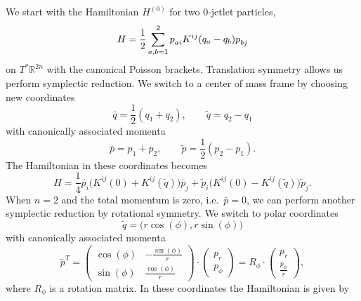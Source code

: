 \documentclass[12pt]{amsart}
\newcommand{\R}{\ensuremath{\mathbb{R}}}
\begin{document}
We start with the Hamiltonian $H^{(0)}$ for two $0$-jetlet particles,
\begin{equation}\label{eq:H-two-0jetlets}
  H = \frac{1}{2} \sum_{a,b=1}^2 p\indices{_a_i} K^{ij}(q_a - q_b) p\indices{_b_j}
\end{equation}
on $T^* \R^{2n}$ with the canonical Poisson brackets.
Translation symmetry allows us perform symplectic reduction. We switch
to a center of mass frame by choosing new coordinates
\begin{equation}\label{eq:CoM-coords}
  \bar{q} = \frac{1}{2}(q_1 + q_2), \qquad \tilde{q} = q_2 - q_1
\end{equation}
with canonically associated momenta
\begin{equation*}
  \bar{p} = p_1 + p_2, \qquad \tilde{p} = \frac{1}{2}(p_2 - p_1).
\end{equation*}
The Hamiltonian in these coordinates becomes
\begin{equation*}
  H = \frac{1}{4} \bar{p}_i \big( K^{ij}(0) + K^{ij}(\tilde{q}) \big)   \bar{p}_j
              + \tilde{p}_i \big( K^{ij}(0) - K^{ij}(\tilde{q}) \big) \tilde{p}_j.
\end{equation*}
When $n = 2$ and the total momentum is zero, i.e.~$\bar{p} = 0$, we can perform
another symplectic reduction by rotational symmetry. We switch to
polar coordinates
\begin{equation}\label{eq:polar-coords}
  \tilde{q} = \big(r\cos(\phi),r\sin(\phi)\big)
\end{equation}
with canonically associated momenta
\begin{equation*}
  \tilde{p}^T =
  \begin{pmatrix}
    \cos(\phi) & -\frac{\sin(\phi)}{r} \\
    \sin(\phi) &  \frac{\cos(\phi)}{r}
  \end{pmatrix} \cdot
  \begin{pmatrix}
    p_r \\
    p_\phi
  \end{pmatrix}
  = R_\phi \cdot
  \begin{pmatrix}
    p_r \\
    \frac{p_\phi}{r}
  \end{pmatrix},
\end{equation*}
where $R_\phi$ is a rotation matrix. In these coordinates the
Hamiltonian is given by
\end{document}
